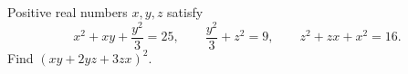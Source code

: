 Positive real numbers $x,y,z$ satisfy
\[
x^2+xy+\dfrac{y^2}{3}=25,\qquad \dfrac{y^2}{3}+z^2=9,\qquad
z^2+zx+x^2=16.
\]
Find $(xy+2yz+3zx)^2$.

